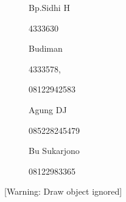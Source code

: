 \documentclass{article}
\begin{document}
\begin{figure}
\centering
\begin{minipage}{3.069cm}
Bp.Sidhi H

4333630

\end{minipage}
\end{figure}
\begin{figure}
\centering
\begin{minipage}{3.069cm}
Budiman

4333578, 

08122942583

\end{minipage}
\end{figure}
\begin{figure}
\centering
\begin{minipage}{3.17cm}
Agung DJ

085228245479

Bu Sukarjono

08122983365
\end{minipage}
\end{figure}
[Warning: Draw object ignored]
\end{document}
